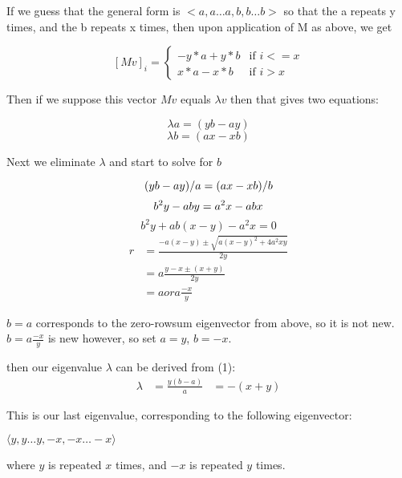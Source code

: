 \documentclass{report}
\begin{document}
If we guess that the general form is $<a, a\ldots a, b, b\ldots b>$ so that the
a repeats y times, and the b repeats x times, then upon application of M as
above, we get

\[ {[Mv]}_i = \begin{cases}
	-y*a + y*b & \text{if } i <= x\\
	x*a - x*b & \text{if } i > x
\end{cases} \]

Then if we suppose this vector $Mv$ equals $\lambda v$ then that gives two
equations:

\begin{equation}
	\lambda a = (yb - ay)
\end{equation}
\begin{equation*}
	\lambda b = (ax - xb)
\end{equation*}

Next we eliminate $\lambda$ and start to solve for $b$

\begin{equation*}
	(yb - ay)/a = (ax - xb)/b\\
\end{equation*}
\begin{equation*}
	b^2y - aby = a^2x - abx\\
\end{equation*}
\begin{equation*}
	b^2y + ab(x - y) - a^2x = 0
\end{equation*}
\begin{align*}
	r &= \frac{-a(x-y) \pm \sqrt{{a(x-y)}^2 + 4a^2xy}}{2y}\\
	  &= a\frac{y - x \pm (x + y)}{2y}\\
	  &= a or a\frac{-x}{y}
\end{align*}

$b = a$ corresponds to the zero-rowsum eigenvector from above, so it is not
new.
$b = a\frac{-x}{y}$ is new however, so set $a = y$, $b = -x$.

then our eigenvalue $\lambda$ can be derived from (1):
\begin{align*}
	\lambda &= \frac{y(b - a)}{a}
			&= -(x + y)
\end{align*}

This is our last eigenvalue, corresponding to the following eigenvector:

$\langle y, y\ldots y, -x, -x\ldots -x\rangle$

where $y$ is repeated $x$ times, and $-x$ is repeated $y$ times.
\end{document}
